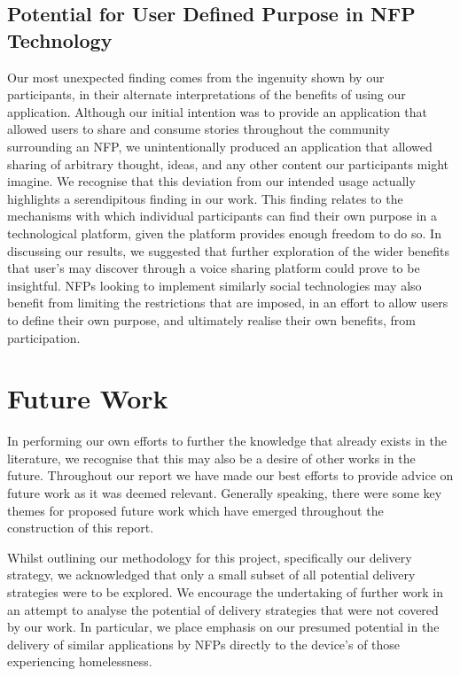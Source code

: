 \subsection{Potential for User Defined Purpose in NFP Technology}

Our most unexpected finding comes from the ingenuity shown by our participants, in their alternate interpretations of the benefits of using our application. Although our initial intention was to provide an application that allowed users to share and consume stories throughout the community surrounding an NFP, we unintentionally produced an application that allowed sharing of arbitrary thought, ideas, and any other content our participants might imagine. We recognise that this deviation from our intended usage actually highlights a serendipitous finding in our work. This finding relates to the mechanisms with which individual participants can find their own purpose in a technological platform, given the platform provides enough freedom to do so. In discussing our results, we suggested that further exploration of the wider benefits that user's may discover through a voice sharing platform could prove to be insightful. NFPs looking to implement similarly social technologies may also benefit from limiting the restrictions that are imposed, in an effort to allow users to define their own purpose, and ultimately realise their own benefits, from participation.

\section{Future Work}

In performing our own efforts to further the knowledge that already exists in the literature, we recognise that this may also be a desire of other works in the future. Throughout our report we have made our best efforts to provide advice on future work as it was deemed relevant. Generally speaking, there were some key themes for proposed future work which have emerged throughout the construction of this report.

Whilst outlining our methodology for this project, specifically our delivery strategy, we acknowledged that only a small subset of all potential delivery strategies were to be explored. We encourage the undertaking of further work in an attempt to analyse the potential of delivery strategies that were not covered by our work. In particular, we place emphasis on our presumed potential in the delivery of similar applications by NFPs directly to the device's of those experiencing homelessness.

